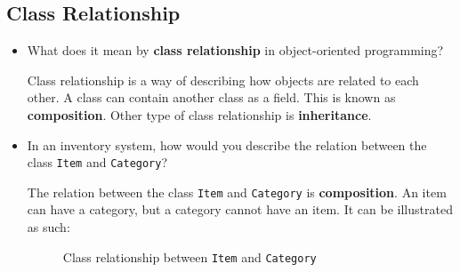 \documentclass[12pt,titlepage]{article}
\begin{document}
\subsection*{Class Relationship}
\begin{itemize}
    \item {
        What does it mean by \textbf{class relationship} in object-oriented programming?

        Class relationship is a way of describing how objects are related to each other.
        A class can contain another class as a field. This is known as \textbf{composition}.
        Other type of class relationship is \textbf{inheritance}.
    }
    \item {
        In an inventory system, how would you describe the relation between the class \texttt{Item} and
        \texttt{Category}?

        The relation between the class \texttt{Item} and \texttt{Category} is \textbf{composition}.
        An item can have a category, but a category cannot have an item. It can be illustrated as such:

        \begin{figure}[h]
            \centering
            \caption{Class relationship between \texttt{Item} and \texttt{Category}}
            \label{fig:uml-item-category}
        \end{figure}
    }
\end{itemize}
\end{document}
